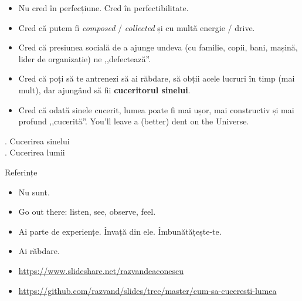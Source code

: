 \documentclass{simple}
\begin{document}
\begin{frame}{}
  \begin{itemize}
    \pause \item Nu cred în perfecțiune. Cred în perfectibilitate.
    \pause \item Cred că putem fi \textit{composed} / \textit{collected} și cu multă energie / drive.
    \pause \item Cred că presiunea socială de a ajunge undeva (cu familie, copii, bani, mașină, lider de organizație) ne ,,defectează''.
    \pause \item Cred că poți să te antrenezi să ai răbdare, să obții acele lucruri în timp (mai mult), dar ajungând să fii \textbf{cuceritorul sinelui}.
    \pause \item Cred că odată sinele cucerit, lumea poate fi mai ușor, mai constructiv și mai profund ,,cucerită''. You'll leave a (better) dent on the Universe.
  \end{itemize}
\end{frame}

\begin{frame}{}
  \centering
  . Cucerirea sinelui \\
  \vspace{3mm}
  . Cucerirea lumii
\end{frame}

\begin{frame}{Referințe}
  \begin{itemize}
    \pause \item Nu sunt.
    \pause \item Go out there: listen, see, observe, feel.
    \pause \item Ai parte de experiențe. Învață din ele. Îmbunătățește-te.
    \pause \item Ai răbdare.
    \pause \item \url{https://www.slideshare.net/razvandeaconescu}
    \pause \item \url{https://github.com/razvand/slides/tree/master/cum-sa-cuceresti-lumea}
  \end{itemize}
\end{frame}
\end{document}
